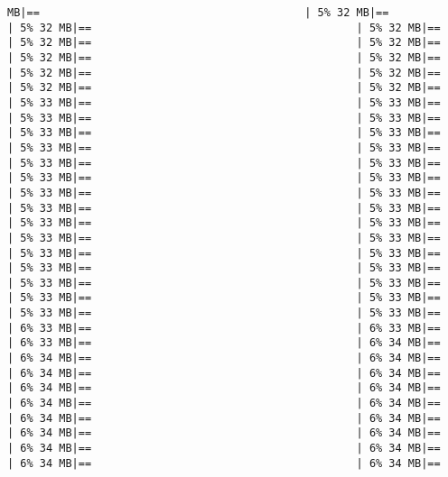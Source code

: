 \documentclass[
]{article}
\begin{document}
\begin{verbatim}
MB|==                                         | 5% 32 MB|==                                         | 5% 32 MB|==                                         | 5% 32 MB|==                                         | 5% 32 MB|==                                         | 5% 32 MB|==                                         | 5% 32 MB|==                                         | 5% 32 MB|==                                         | 5% 32 MB|==                                         | 5% 32 MB|==                                         | 5% 32 MB|==                                         | 5% 32 MB|==                                         | 5% 33 MB|==                                         | 5% 33 MB|==                                         | 5% 33 MB|==                                         | 5% 33 MB|==                                         | 5% 33 MB|==                                         | 5% 33 MB|==                                         | 5% 33 MB|==                                         | 5% 33 MB|==                                         | 5% 33 MB|==                                         | 5% 33 MB|==                                         | 5% 33 MB|==                                         | 5% 33 MB|==                                         | 5% 33 MB|==                                         | 5% 33 MB|==                                         | 5% 33 MB|==                                         | 5% 33 MB|==                                         | 5% 33 MB|==                                         | 5% 33 MB|==                                         | 5% 33 MB|==                                         | 5% 33 MB|==                                         | 5% 33 MB|==                                         | 5% 33 MB|==                                         | 5% 33 MB|==                                         | 5% 33 MB|==                                         | 5% 33 MB|==                                         | 5% 33 MB|==                                         | 5% 33 MB|==                                         | 5% 33 MB|==                                         | 5% 33 MB|==                                         | 5% 33 MB|==                                         | 6% 33 MB|==                                         | 6% 33 MB|==                                         | 6% 33 MB|==                                         | 6% 34 MB|==                                         | 6% 34 MB|==                                         | 6% 34 MB|==                                         | 6% 34 MB|==                                         | 6% 34 MB|==                                         | 6% 34 MB|==                                         | 6% 34 MB|==                                         | 6% 34 MB|==                                         | 6% 34 MB|==                                         | 6% 34 MB|==                                         | 6% 34 MB|==                                         | 6% 34 MB|==                                         | 6% 34 MB|==                                         | 6% 34 MB|==                                         | 6% 34 MB|==                                         | 6% 34 MB|==                                         | 6% 34 MB|==                    
\end{verbatim}
\end{document}
